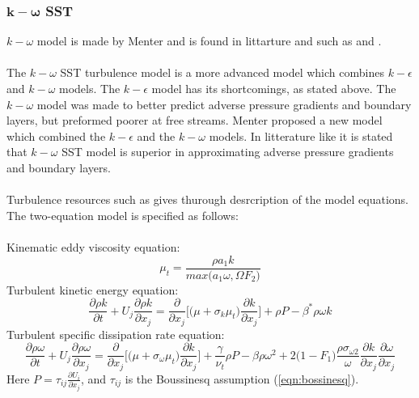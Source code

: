 \documentclass[a4paper, 12pt]{report}
\begin{document}
\subsubsection{$\boldsymbol{k}-\boldsymbol{\omega}$ SST}
$k-\omega$ model is made by Menter \cite{SST} and is found in littarture and such as \cite{CFD} and \cite{Wilcox}.\\
\\
The $k-\omega$ SST turbulence model is a more advanced model which combines $k-\epsilon$ and $k-\omega$ models. The $k-\epsilon$ model has its shortcomings, as stated above. The $k-\omega$ model was made to better predict adverse pressure gradients and boundary layers, but preformed poorer at free streams. Menter \cite{reviewOfSSTModel} proposed a new model which combined the $k-\epsilon$ and the $k-\omega$ models. In litterature like \cite{CFD} it is stated that $k-\omega$ SST model is superior in approximating adverse pressure gradients and boundary layers.\\
\\
Turbulence resources such as \cite{NASA_SST} gives thurough desrcription of the model equations. The two-equation model is specified as follows:\\
\\
Kinematic eddy viscosity equation:
\begin{equation}
\mu_t = \frac{\rho a_1 k}{max\big(a_1\omega, \Omega F_2\big)}
\label{eqn:kOmegaSSTTurbulentViscosity}
\end{equation}
Turbulent kinetic energy equation:
\begin{equation}
\frac{\partial \rho k}{\partial t} + U_j \frac{\partial \rho k}{\partial x_j} = \frac{\partial }{\partial x_j}\Big[\big(\mu + \sigma_k\mu_t\big)\frac{\partial k}{\partial x_j} \Big] + \rho P - \beta^* \rho \omega k
\label{eqn:kOmegaSSTKequation}
\end{equation}
Turbulent specific dissipation rate equation:
\begin{equation}
\frac{\partial \rho \omega}{\partial t} + U_j \frac{\partial \rho \omega}{\partial x_j} =
\frac{\partial }{\partial x_j}\Big[\big(\mu + \sigma_{\omega}\mu_t\big)\frac{\partial k}{\partial x_j} \Big] + \frac{\gamma}{\nu_t} \rho P - \beta \rho \omega^2 + 2\big(1 -F_1\big)\frac{\rho \sigma_{\omega 2}}{\omega}\frac{\partial k}{\partial x_j}\frac{\partial \omega}{\partial x_j}
\label{eqn:kOmegaSSTOmegaequation}
\end{equation}
Here $P = \tau_{ij}\frac{\partial U_i}{\partial x_j}$, and $\tau_{ij}$ is the Boussinesq assumption (\ref{eqn:bossinesq}).
\end{document}
